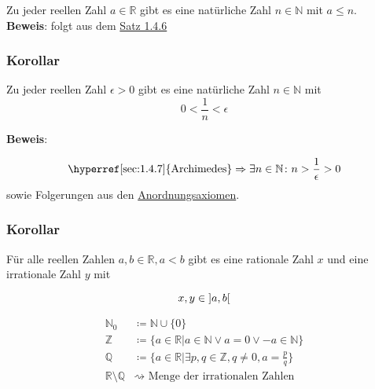 \documentclass{article}
\begin{document}
Zu jeder reellen Zahl $a \in \mathbb{R}$ gibt es eine natürliche Zahl $n \in \mathbb{N}$ mit $a \leq n$. \\

\textbf{Beweis}: folgt aus dem \hyperref[sec:1.4.6]{Satz 1.4.6}

\subsubsection{Korollar}

Zu jeder reellen Zahl $\epsilon > 0$ gibt es eine natürliche Zahl $n \in \mathbb{N}$ mit
\[
  0 < \frac{1}{n} < \epsilon 
\]

\textbf{Beweis}:

\[
  \text{\hyperref[sec:1.4.7]{Archimedes}} \Rightarrow \exists n \in \mathbb{N} \colon n > \frac{1}{\epsilon} > 0
\]
sowie Folgerungen aus den \hyperref[sec:1.2.3]{Anordnungsaxiomen}.

\subsubsection{Korollar}

Für alle reellen Zahlen $a, b \in \mathbb{R}, a < b$ gibt es eine rationale Zahl $x$
und eine irrationale Zahl $y$ mit

\[
  x, y \in \interval[open]{a}{b}
\]

\begin{align*}
  \mathbb{N}_0                    &\coloneqq \mathbb{N} \cup \{ 0 \} \\
  \mathbb{Z}                      &\coloneqq \{ a \in \mathbb{R} | a \in \mathbb{N} \lor a = 0 \lor -a \in \mathbb{N} \} \\
  \mathbb{Q}                      &\coloneqq \{ a \in \mathbb{R} | \exists p, q \in \mathbb{Z}, q \ne 0, a = \frac{p}{q} \} \\
  \mathbb{R} \setminus \mathbb{Q} &\rightsquigarrow \text{ Menge der irrationalen Zahlen} \\
\end{align*}
\end{document}
